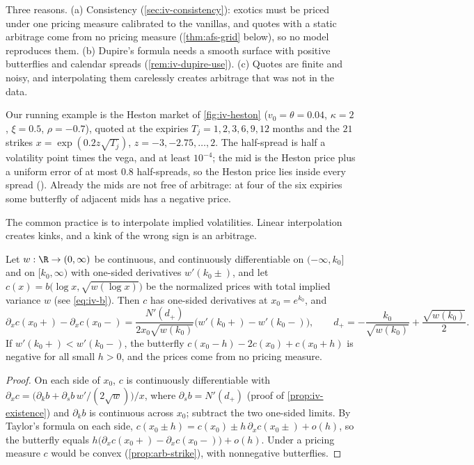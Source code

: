 Three reasons. (a) Consistency (\cref{sec:iv-consistency}): exotics must be priced under one pricing measure
calibrated to the vanillas, and quotes with a static arbitrage come from no pricing measure
(\cref{thm:afs-grid} below), so no model reproduces them. (b) Dupire's formula needs a smooth surface with
positive butterflies and calendar spreads (\cref{rem:iv-dupire-use}). (c) Quotes are finite and noisy, and
interpolating them carelessly creates arbitrage that was not in the data.

Our running example is the Heston market of \cref{fig:iv-heston} ($v_0=\theta=0.04$, $\kappa=2$, $\xi=0.5$,
$\rho=-0.7$), quoted at the expiries $T_j=1,2,3,6,9,12$ months and the $21$ strikes
$x=\exp(0.2z\sqrt{T_j})$, $z=-3,-2.75,\dots,2$. The half-spread is half a volatility point times the vega,
and at least $10^{-4}$; the mid is the Heston price plus a uniform error of at most $0.8$ half-spreads, so the
Heston price lies inside every spread (). Already the mids are not
free of arbitrage: at four of the six expiries some butterfly of adjacent mids has a negative price.

The common practice is to interpolate implied volatilities. Linear interpolation creates kinks, and a kink of
the wrong sign is an arbitrage.

\begin{proposition}\label{prop:afs-kink}
Let $w:\R\to(0,\infty)$ be continuous, and continuously differentiable on $(-\infty,k_0]$ and on
$[k_0,\infty)$ with one-sided derivatives $w'(k_0\pm)$, and let $c(x)=b\big(\log x,\sqrt{w(\log x)}\big)$ be the
normalized prices with total implied variance $w$ (see \eqref{eq:iv-b}). Then $c$ has one-sided derivatives at
$x_0=e^{k_0}$, and
\[
  \partial_xc(x_0+)-\partial_xc(x_0-)=\frac{N'(d_+)}{2x_0\sqrt{w(k_0)}}\big(w'(k_0+)-w'(k_0-)\big),\qquad
  d_+=-\frac{k_0}{\sqrt{w(k_0)}}+\frac{\sqrt{w(k_0)}}2 .
\]
If $w'(k_0+)<w'(k_0-)$, the butterfly $c(x_0-h)-2c(x_0)+c(x_0+h)$ is negative for all small $h>0$, and the
prices come from no pricing measure.
\end{proposition}

\begin{proof}
On each side of $x_0$, $c$ is continuously differentiable with
$\partial_xc=\big(\partial_kb+\partial_sb\,w'/(2\sqrt w)\big)/x$, where $\partial_sb=N'(d_+)$ (proof of
\cref{prop:iv-existence}) and $\partial_kb$ is continuous across $x_0$; subtract the two one-sided limits. By
Taylor's formula on each side, $c(x_0\pm h)=c(x_0)\pm h\,\partial_xc(x_0\pm)+o(h)$, so the butterfly equals
$h\big(\partial_xc(x_0+)-\partial_xc(x_0-)\big)+o(h)$. Under a pricing measure $c$ would be convex
(\cref{prop:arb-strike}), with nonnegative butterflies.
\end{proof}

